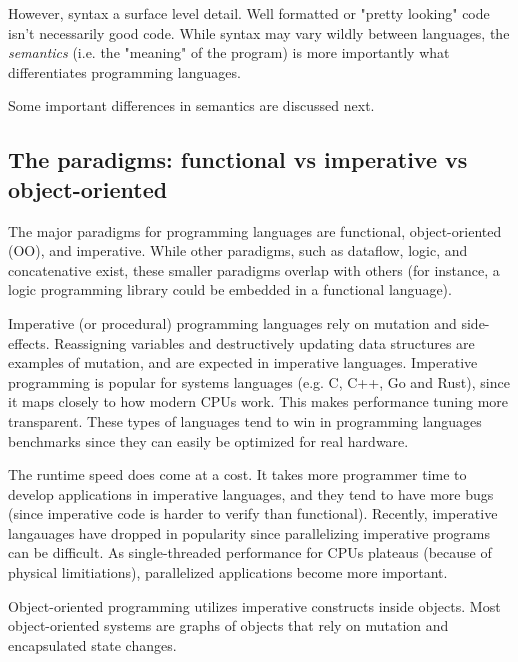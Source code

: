 \documentclass{book}
\newcommand{\Ssubsubsection}[2]{\subsubsection[#1]{#2}}
\renewcommand{\Ssubsubsection}[2]{\subsection[#1]{#2}}
\begin{document}
However, syntax a surface level detail. Well formatted or "pretty looking"
code isn{'}t necessarily good code. While syntax may vary wildly between
languages, the \textit{semantics} (i.e. the "meaning" of the program) is
more importantly what differentiates programming languages.

Some important differences in semantics are discussed next.

\Ssubsubsection{The paradigms: functional vs imperative vs object{-}oriented}{The paradigms: functional vs imperative vs object{-}oriented}\label{t:x28part_x22Thex5fparadigmsx5fx5ffunctionalx5fvsx5fimperativex5fvsx5fobjectx2dorientedx22x29}

The major paradigms for programming languages are functional,
object{-}oriented (OO), and imperative. While other paradigms, such as
dataflow, logic, and concatenative exist, these smaller paradigms overlap
with others (for instance, a logic programming
library could be embedded in a functional language).

Imperative (or procedural) programming languages rely on mutation and
side{-}effects. Reassigning variables and destructively updating data structures
are examples of mutation, and are expected in imperative languages.
Imperative programming is popular for systems languages (e.g. C, C++,
Go and Rust), since it maps closely to how modern CPUs work. This makes
performance tuning more transparent. These types of languages tend to win
in programming languages benchmarks since they can easily be optimized for
real hardware.

The runtime speed does come at a cost. It takes more programmer time to
develop applications in imperative languages, and they tend to have more
bugs (since imperative code is harder to verify than functional). Recently,
imperative langauages have dropped in popularity since parallelizing
imperative programs can be difficult. As single{-}threaded performance for
CPUs plateaus (because of physical limitiations), parallelized
applications become more important.

Object{-}oriented programming utilizes imperative constructs inside objects.
Most object{-}oriented systems are graphs of objects that rely on mutation
and encapsulated state changes.
\end{document}
